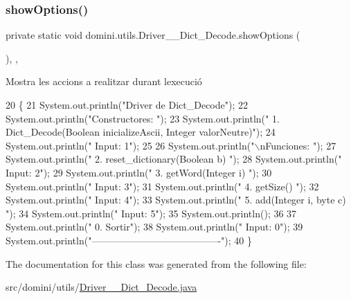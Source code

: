 \subsubsection{\texorpdfstring{show\+Options()}{showOptions()}}
{\footnotesize\ttfamily private static void domini.\+utils.\+Driver\+\_\+\+\_\+\+Dict\+\_\+\+Decode.\+show\+Options (\begin{DoxyParamCaption}{ }\end{DoxyParamCaption})\hspace{0.3cm}{\ttfamily [inline]}, {\ttfamily [static]}, {\ttfamily [private]}}



Mostra les accions a realitzar durant l\textquotesingle{}execució 


\begin{DoxyCode}
20                                      \{
21         System.out.println(\textcolor{stringliteral}{"Driver de Dict\_Decode"});
22         System.out.println(\textcolor{stringliteral}{"Constructores: "});
23         System.out.println(\textcolor{stringliteral}{"     1. Dict\_Decode(Boolean inicializeAscii, Integer valorNeutre)"});
24         System.out.println(\textcolor{stringliteral}{"     Input: 1"});
25 
26         System.out.println(\textcolor{stringliteral}{"\(\backslash\)nFunciones: "});
27         System.out.println(\textcolor{stringliteral}{"     2. reset\_dictionary(Boolean b) "});
28         System.out.println(\textcolor{stringliteral}{"     Input: 2"});
29         System.out.println(\textcolor{stringliteral}{"     3. getWord(Integer i) "});
30         System.out.println(\textcolor{stringliteral}{"     Input: 3"});
31         System.out.println(\textcolor{stringliteral}{"     4. getSize() "});
32         System.out.println(\textcolor{stringliteral}{"     Input: 4"});
33         System.out.println(\textcolor{stringliteral}{"     5. add(Integer i, byte c) "});
34         System.out.println(\textcolor{stringliteral}{"     Input: 5"});
35         System.out.println();
36 
37         System.out.println(\textcolor{stringliteral}{"     0. Sortir"});
38         System.out.println(\textcolor{stringliteral}{"     Input: 0"});
39         System.out.println(\textcolor{stringliteral}{"----------------------------------------"});
40     \}
\end{DoxyCode}


The documentation for this class was generated from the following file\+:\begin{DoxyCompactItemize}
\item 
src/domini/utils/\hyperlink{Driver____Dict__Decode_8java}{Driver\+\_\+\+\_\+\+Dict\+\_\+\+Decode.\+java}\end{DoxyCompactItemize}
